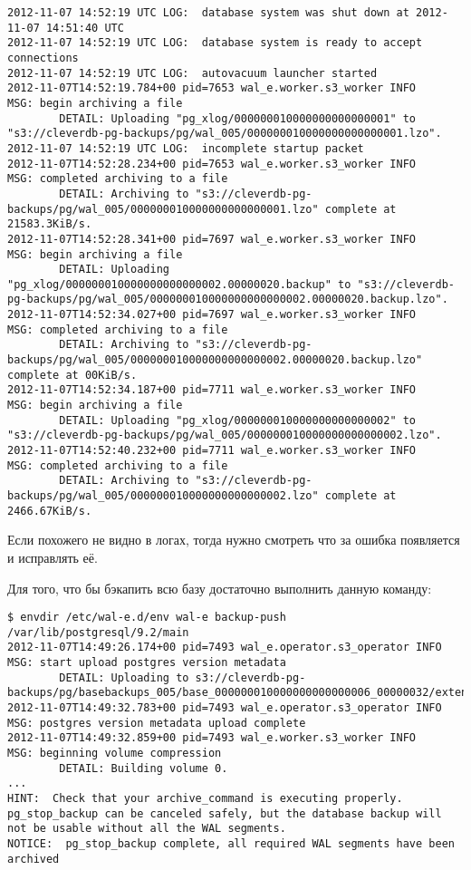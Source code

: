 \begin{lstlisting}[label=lst:wal-e8,caption=Логи PostgreSQL]
2012-11-07 14:52:19 UTC LOG:  database system was shut down at 2012-11-07 14:51:40 UTC
2012-11-07 14:52:19 UTC LOG:  database system is ready to accept connections
2012-11-07 14:52:19 UTC LOG:  autovacuum launcher started
2012-11-07T14:52:19.784+00 pid=7653 wal_e.worker.s3_worker INFO     MSG: begin archiving a file
        DETAIL: Uploading "pg_xlog/000000010000000000000001" to "s3://cleverdb-pg-backups/pg/wal_005/000000010000000000000001.lzo".
2012-11-07 14:52:19 UTC LOG:  incomplete startup packet
2012-11-07T14:52:28.234+00 pid=7653 wal_e.worker.s3_worker INFO     MSG: completed archiving to a file 
        DETAIL: Archiving to "s3://cleverdb-pg-backups/pg/wal_005/000000010000000000000001.lzo" complete at 21583.3KiB/s. 
2012-11-07T14:52:28.341+00 pid=7697 wal_e.worker.s3_worker INFO     MSG: begin archiving a file
        DETAIL: Uploading "pg_xlog/000000010000000000000002.00000020.backup" to "s3://cleverdb-pg-backups/pg/wal_005/000000010000000000000002.00000020.backup.lzo".
2012-11-07T14:52:34.027+00 pid=7697 wal_e.worker.s3_worker INFO     MSG: completed archiving to a file 
        DETAIL: Archiving to "s3://cleverdb-pg-backups/pg/wal_005/000000010000000000000002.00000020.backup.lzo" complete at 00KiB/s. 
2012-11-07T14:52:34.187+00 pid=7711 wal_e.worker.s3_worker INFO     MSG: begin archiving a file
        DETAIL: Uploading "pg_xlog/000000010000000000000002" to "s3://cleverdb-pg-backups/pg/wal_005/000000010000000000000002.lzo".
2012-11-07T14:52:40.232+00 pid=7711 wal_e.worker.s3_worker INFO     MSG: completed archiving to a file 
        DETAIL: Archiving to "s3://cleverdb-pg-backups/pg/wal_005/000000010000000000000002.lzo" complete at 2466.67KiB/s. 
\end{lstlisting}

Если похожего не видно в логах, тогда нужно смотреть что за ошибка появляется и исправлять её.

Для того, что бы бэкапить всю базу достаточно выполнить данную команду:

\begin{lstlisting}[label=lst:wal-e9,caption=Загрузка бэкапа всей базы данных в S3]
$ envdir /etc/wal-e.d/env wal-e backup-push /var/lib/postgresql/9.2/main
2012-11-07T14:49:26.174+00 pid=7493 wal_e.operator.s3_operator INFO     MSG: start upload postgres version metadata
        DETAIL: Uploading to s3://cleverdb-pg-backups/pg/basebackups_005/base_000000010000000000000006_00000032/extended_version.txt.
2012-11-07T14:49:32.783+00 pid=7493 wal_e.operator.s3_operator INFO     MSG: postgres version metadata upload complete
2012-11-07T14:49:32.859+00 pid=7493 wal_e.worker.s3_worker INFO     MSG: beginning volume compression
        DETAIL: Building volume 0.
...
HINT:  Check that your archive_command is executing properly.  pg_stop_backup can be canceled safely, but the database backup will not be usable without all the WAL segments.
NOTICE:  pg_stop_backup complete, all required WAL segments have been archived
\end{lstlisting}

